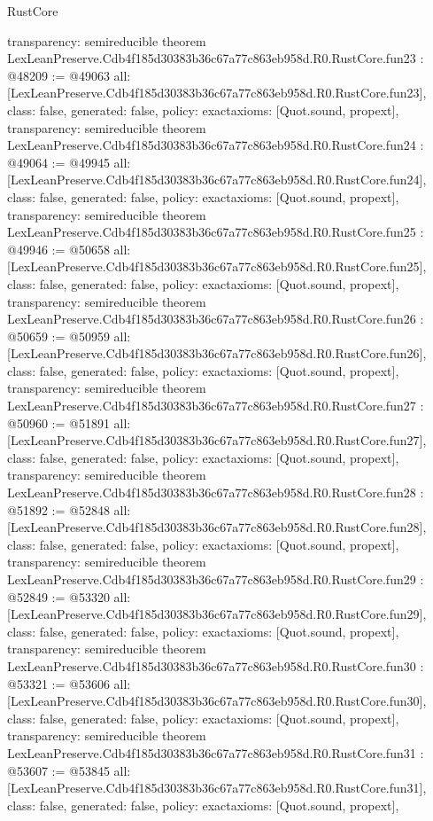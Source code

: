 \begin{lexlean}{RustCore}
\begin{coremodule}
{  transparency: semireducible
}
theorem LexLeanPreserve.Cdb4f185d30383b36c67a77c863eb958d.R0.RustCore.fun23 : @48209 := @49063 {
  all: [LexLeanPreserve.Cdb4f185d30383b36c67a77c863eb958d.R0.RustCore.fun23],
  class: false,
  generated: false,
  policy: exact{axioms: [Quot.sound, propext]},
  transparency: semireducible
}
theorem LexLeanPreserve.Cdb4f185d30383b36c67a77c863eb958d.R0.RustCore.fun24 : @49064 := @49945 {
  all: [LexLeanPreserve.Cdb4f185d30383b36c67a77c863eb958d.R0.RustCore.fun24],
  class: false,
  generated: false,
  policy: exact{axioms: [Quot.sound, propext]},
  transparency: semireducible
}
theorem LexLeanPreserve.Cdb4f185d30383b36c67a77c863eb958d.R0.RustCore.fun25 : @49946 := @50658 {
  all: [LexLeanPreserve.Cdb4f185d30383b36c67a77c863eb958d.R0.RustCore.fun25],
  class: false,
  generated: false,
  policy: exact{axioms: [Quot.sound, propext]},
  transparency: semireducible
}
theorem LexLeanPreserve.Cdb4f185d30383b36c67a77c863eb958d.R0.RustCore.fun26 : @50659 := @50959 {
  all: [LexLeanPreserve.Cdb4f185d30383b36c67a77c863eb958d.R0.RustCore.fun26],
  class: false,
  generated: false,
  policy: exact{axioms: [Quot.sound, propext]},
  transparency: semireducible
}
theorem LexLeanPreserve.Cdb4f185d30383b36c67a77c863eb958d.R0.RustCore.fun27 : @50960 := @51891 {
  all: [LexLeanPreserve.Cdb4f185d30383b36c67a77c863eb958d.R0.RustCore.fun27],
  class: false,
  generated: false,
  policy: exact{axioms: [Quot.sound, propext]},
  transparency: semireducible
}
theorem LexLeanPreserve.Cdb4f185d30383b36c67a77c863eb958d.R0.RustCore.fun28 : @51892 := @52848 {
  all: [LexLeanPreserve.Cdb4f185d30383b36c67a77c863eb958d.R0.RustCore.fun28],
  class: false,
  generated: false,
  policy: exact{axioms: [Quot.sound, propext]},
  transparency: semireducible
}
theorem LexLeanPreserve.Cdb4f185d30383b36c67a77c863eb958d.R0.RustCore.fun29 : @52849 := @53320 {
  all: [LexLeanPreserve.Cdb4f185d30383b36c67a77c863eb958d.R0.RustCore.fun29],
  class: false,
  generated: false,
  policy: exact{axioms: [Quot.sound, propext]},
  transparency: semireducible
}
theorem LexLeanPreserve.Cdb4f185d30383b36c67a77c863eb958d.R0.RustCore.fun30 : @53321 := @53606 {
  all: [LexLeanPreserve.Cdb4f185d30383b36c67a77c863eb958d.R0.RustCore.fun30],
  class: false,
  generated: false,
  policy: exact{axioms: [Quot.sound, propext]},
  transparency: semireducible
}
theorem LexLeanPreserve.Cdb4f185d30383b36c67a77c863eb958d.R0.RustCore.fun31 : @53607 := @53845 {
  all: [LexLeanPreserve.Cdb4f185d30383b36c67a77c863eb958d.R0.RustCore.fun31],
  class: false,
  generated: false,
  policy: exact{axioms: [Quot.sound, propext]},
}
\end{coremodule}
\end{lexlean}
